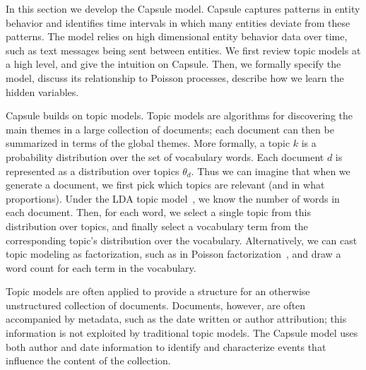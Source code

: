 
In this section we develop the Capsule model.  Capsule captures patterns in entity behavior and identifies time intervals in which many entities deviate from these patterns.  The model relies on high dimensional entity behavior data over time, such as text messages being sent between entities.  We first review topic models at a high level, and give the intuition on Capsule. Then, we formally specify the model, discuss its relationship to Poisson processes, describe how we learn the hidden variables.

 Capsule builds on topic models.  Topic models are algorithms for discovering the main themes in a large collection of documents; each document can then be summarized in terms of the global themes.  More formally, a topic $k$ is a probability distribution over the set of vocabulary words.  Each document $d$ is represented as a distribution over topics $\theta_d$.  Thus we can imagine that when we generate a document, we first pick which topics are relevant (and in what proportions).  Under the LDA topic model~\cite{Blei:2003}, we know the number of words in each document.  Then, for each word, we select a single topic from this distribution over topics, and finally select a vocabulary term from the corresponding topic's distribution over the vocabulary.  Alternatively, we can cast topic modeling as factorization, such as in Poisson factorization~\cite{Gopalan:2014b}, and draw a word count for each term in the vocabulary.

Topic models are often applied to provide a structure for an otherwise unstructured collection of documents.  Documents, however, are often accompanied by metadata, such as the date written or author attribution; this information is not exploited by traditional topic models.  The Capsule model uses both author and date information to identify and characterize events that influence the content of the collection.


